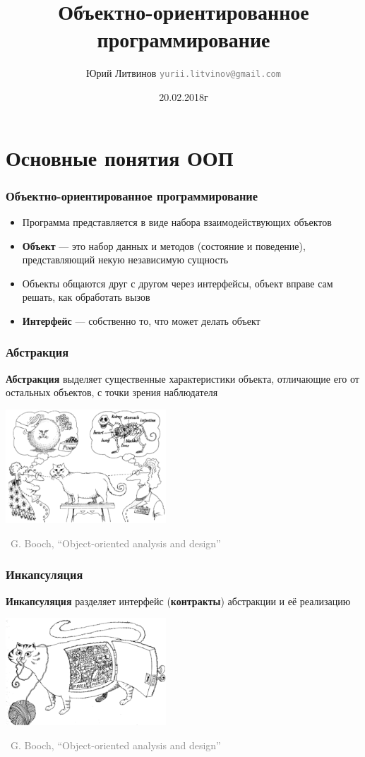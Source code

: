 \documentclass[xetex,mathserif,serif]{beamer}
\title{Объектно-ориентированное программирование}
\author[Юрий Литвинов]{Юрий Литвинов \newline \textcolor{gray}{\small\texttt{yurii.litvinov@gmail.com}}}
\date{20.02.2018г}
\newcommand{\attribution}[1] {
	\begin{flushright}\begin{scriptsize}\textcolor{gray}{\textcopyright\, #1}\end{scriptsize}\end{flushright}
}
\begin{document}
	
	\frame{\titlepage}

	\section{Основные понятия ООП}

	\begin{frame}
		\frametitle{Объектно-ориентированное программирование}
		\begin{itemize}
			\item Программа представляется в виде набора взаимодействующих объектов
			\item \textbf{Объект} --- это набор данных и методов (состояние и поведение), представляющий некую независимую сущность
			\item Объекты общаются друг с другом через интерфейсы, объект вправе сам решать, как обработать вызов
			\item \textbf{Интерфейс} --- собственно то, что может делать объект
		\end{itemize}
	\end{frame}

	\begin{frame}
		\frametitle{Абстракция}
		\textbf{Абстракция} выделяет существенные характеристики объекта, отличающие его от остальных объектов, с точки зрения наблюдателя
		\vskip 1cm
		\begin{center}
			\includegraphics[width=0.45\textwidth]{abstraction.png}
		\end{center}
		\attribution{G. Booch, ``Object-oriented analysis and design''}
	\end{frame}

	\begin{frame}
		\frametitle{Инкапсуляция}
		\textbf{Инкапсуляция} разделяет интерфейс (\textbf{контракты}) абстракции и её реализацию

		\vskip 1cm
		\begin{center}
			\includegraphics[width=0.45\textwidth]{incapsulation.png}
		\end{center}
		\attribution{G. Booch, ``Object-oriented analysis and design''}
	\end{frame}
\end{document}

